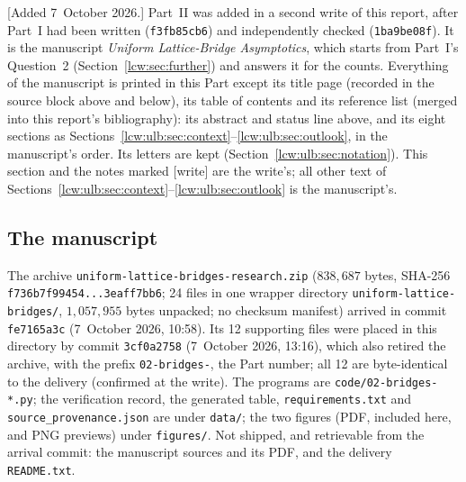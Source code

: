 \documentclass[11pt,letterpaper]{article}
\theoremstyle{remark}\newtheorem{remark}[theorem]{Remark}
\newcommand{\file}[1]{\nolinkurl{#1}}
\begin{document}
[Added 7~October 2026.] Part~II was added in a second write of this report,
after Part~I had been written (\file{f3fb85cb6}) and independently checked
(\file{1ba9be08f}). It is the manuscript \emph{Uniform Lattice-Bridge
Asymptotics}, which starts from Part~I's Question~2
(Section~\ref{lcw:sec:further}) and answers it for the counts. Everything of
the manuscript is printed in this Part except its title page (recorded in
the source block above and below), its table of contents and its reference
list (merged into this report's bibliography): its abstract and status line
above, and its eight sections as
Sections~\ref{lcw:ulb:sec:context}--\ref{lcw:ulb:sec:outlook}, in the
manuscript's order. Its letters are kept
(Section~\ref{lcw:ulb:sec:notation}). This section and the notes marked
[write] are the write's; all other text of
Sections~\ref{lcw:ulb:sec:context}--\ref{lcw:ulb:sec:outlook} is the
manuscript's.

\subsection{The manuscript}\label{lcw:ulb:sec:provenance}

The archive \file{uniform-lattice-bridges-research.zip} ($838{,}687$ bytes,
SHA-256 \file{f736b7f99454...3eaff7bb6}; 24 files in one wrapper directory
\file{uniform-lattice-bridges/}, $1{,}057{,}955$ bytes unpacked; no checksum
manifest) arrived in commit \file{fe7165a3c} (7~October 2026, 10:58). Its 12
supporting files were placed in this directory by commit \file{3cf0a2758}
(7~October 2026, 13:16), which also retired the archive, with the prefix
\file{02-bridges-}, the Part number; all 12 are byte-identical to the
delivery (confirmed at the write). The programs are \file{code/02-bridges-*.py};
the verification record, the generated table, \file{requirements.txt} and
\file{source\_provenance.json} are under \file{data/}; the two figures (PDF,
included here, and PNG previews) under \file{figures/}. Not shipped, and
retrievable from the arrival commit: the manuscript sources and its PDF, and
the delivery \file{README.txt}.
\end{document}
